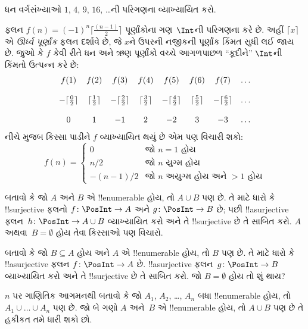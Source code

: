 \documentclass[../../../include/open-logic-section]{subfiles}
\begin{document}
\begin{prob}
ધન વર્ગસંખ્યાઓ $1$, $4$, $9$, $16$, \dots{}ની
પરિગણના વ્યાખ્યાયિત કરો.
\end{prob}

\begin{ex}
ફલન $f(n) = (-1)^{n} \lceil \frac{(n-1)}{2}\rceil$
પૂર્ણાંકોના ગણ~$\Int$ની પરિગણના કરે છે. અહીં
$\lceil x \rceil$ એ \emph{ઊર્ધ્વ પૂર્ણાંક} ફલન
દર્શાવે છે, જે $x$ને ઉપરની નજીકની પૂર્ણાંક કિંમત
સુધી લઈ જાય છે. જુઓ કે $f$ કેવી રીતે ધન અને ઋણ
પૂર્ણાંકો વચ્ચે આગળપાછળ “કૂદીને” $\Int$ની કિંમતો
ઉત્પન્ન કરે છે:
\[
\begin{array}{c c c c c c c c}
f(1) & f(2) & f(3) & f(4) & f(5) & f(6) & f(7) & \dots \\ \\
- \lceil \tfrac{0}{2} \rceil & \lceil \tfrac{1}{2}\rceil & - \lceil \tfrac{2}{2} \rceil & \lceil \tfrac{3}{2} \rceil & - \lceil \tfrac{4}{2} \rceil  & \lceil \tfrac{5}{2}
\rceil & - \lceil \tfrac{6}{2} \rceil & \dots \\ \\
0 & 1 & -1 & 2 & -2 & 3 & -3 & \dots
\end{array}
\]
નીચે મુજબ કિસ્સા પાડીને $f$ વ્યાખ્યાયિત થયું છે
એમ પણ વિચારી શકો:
\[
f(n) = \begin{cases}
  0 & \text{જો $n = 1$ હોય}\\
  n/2 & \text{જો $n$ યુગ્મ હોય}\\
  -(n-1)/2 & \text{જો $n$ અયુગ્મ હોય અને $>1$ હોય}
  \end{cases}
\]
\end{ex}

\begin{prob}
બતાવો કે જો $A$ અને $B$ એ !!{enumerable} હોય,
તો $A \cup B$ પણ છે. તે માટે ધારો કે
!!{surjective} ફલનો $f\colon \PosInt \to
A$ અને $g\colon \PosInt \to B$ છે; પછી
!!a{surjective} ફલન~$h\colon \PosInt \to A \cup B$
વ્યાખ્યાયિત કરો અને તે !!{surjective} છે તે સાબિત કરો.
$A$ અથવા~$B = \emptyset$ હોય તેવા કિસ્સાઓ પણ વિચારો.
\end{prob}

\begin{prob}
બતાવો કે જો $B \subseteq A$ હોય અને $A$ એ
!!{enumerable} હોય, તો $B$ પણ છે. તે માટે ધારો કે
!!a{surjective} ફલન $f\colon \PosInt \to
A$ છે. !!a{surjective} ફલન~$g\colon \PosInt \to B$
વ્યાખ્યાયિત કરો અને તે !!{surjective} છે તે સાબિત કરો.
જો $B = \emptyset$ હોય તો શું થાય?
\end{prob}

\begin{prob}
$n$ પર ગાણિતિક આગમનથી બતાવો કે જો $A_1$, $A_2$,
\dots, $A_n$ બધા !!{enumerable} હોય, તો
$A_1 \cup \dots \cup A_n$ પણ છે.
જો બે ગણો $A$ અને~$B$ એ !!{enumerable} હોય,
તો $A \cup
B$ પણ છે તે હકીકત તમે ધારી શકો છો.
\end{prob}
\end{document}
